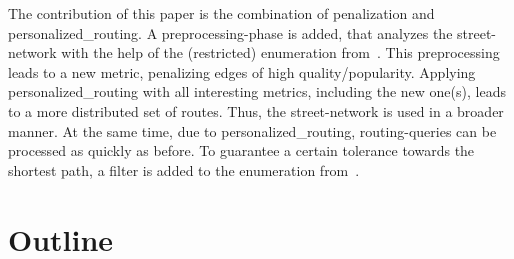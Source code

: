    The contribution of this paper is the combination of penalization and \gls{personalized_routing}.
    A preprocessing-phase is added, that analyzes the street-network with the help of the (restricted) enumeration from~\cite{barth:alternative_multicriteria_routes}.
    This preprocessing leads to a new \gls{metric}, penalizing edges of high quality/popularity.
    Applying \gls{personalized_routing} with all interesting \glspl{metric}, including the new one(s), leads to a more distributed set of routes.
    Thus, the street-network is used in a broader manner.
    At the same time, due to \gls{personalized_routing}, routing-queries can be processed as quickly as before.
    To guarantee a certain tolerance towards the shortest path, a filter is added to the enumeration from~\cite{barth:alternative_multicriteria_routes}.

\section{Outline}

